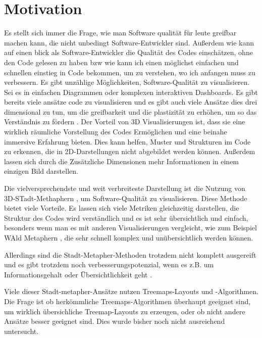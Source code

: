\section{Motivation} \label{sec:Motivation}
Es stellt sich immer die Frage, wie man Software qualität für leute greifbar machen kann, die nicht unbedingt Software-Entwickler sind. Außerdem wie kann auf einen blick als Software-Entwickler die Qualität des Codes einschätzen, ohne den Code gelesen zu haben bzw wie kann ich einen möglichst einfachen und schnellen einstieg in Code bekommen, um zu verstehen, wo ich anfangen muss zu verbessern.
Es gibt unzählige Möglichkeiten, Software-Qualität zu visualisieren. Sei es in einfachen Diagrammen oder komplexen interaktiven Dashboards. 
Es gibt bereits viele ansätze code zu visualisieren und es gibt auch viele Ansätze dies drei dimensional zu tun, um die greifbarkeit und die plastizität zu erhöhen, um so das Verständnis zu fördern \cite{3dsoftwareMarcus,codeCity1,first_3D_vis,virtualButVisibleMunro}. 
Der Vorteil von 3D Visualisierungen ist, dass sie eine wirklich räumliche Vorstellung des Codes Ermöglichen und eine beinahe immersive Erfahrung bieten. Dies kann helfen, Muster und Strukturen im Code zu erkennen, die in 2D-Darstellungen nicht abgebildet werden können. Außerdem lassen sich durch die Zusätzliche Dimensionen mehr Informationen in einem einzigen Bild darstellen.

Die vielversprechendste und weit verbreiteste Darstellung ist die Nutzung von 3D-STadt-Methaphern \cite{codeCity1}, um Software-Qualität zu visualisieren. Diese Methode bietet viele Vorteile. Es lassen sich viele Metriken gleichzeitig darstellen, die Struktur des Codes wird verständlich und es ist sehr übersichtlich und einfach, besonders wenn man es mit anderen Visualisierungen vergleicht, wie zum Beispiel WAld Metaphern \cite{softwareForest}, die sehr schnell komplex und unübersichtlich werden können.

Allerdings sind die Stadt-Metapher-Methoden trotzdem nicht komplett ausgereift und es gibt trotzdem noch verbesserungspotenzial, wenn es z.B. um Informationsgehalt oder Übersichtlichkeit geht \cite{lu2008cascaded}. 

Viele dieser Stadt-metapher-Ansätze nutzen Treemaps-Layouts und -Algorithmen. Die Frage ist ob herkömmliche Treemaps-Algorithmen überhaupt geeignet sind, um wirklich übersichliche Treemap-Layouts zu erzeugen, oder ob nicht andere Ansätze besser geeignet sind. Dies wurde bisher noch nicht ausreichend untersucht.